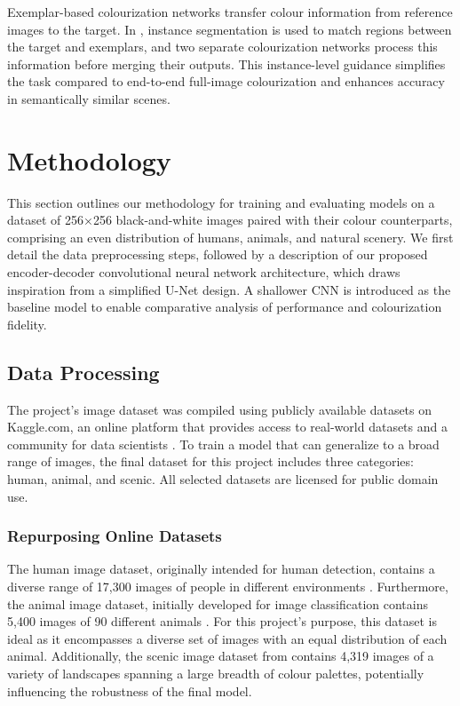 \documentclass{article} %
\begin{document}
Exemplar-based colourization networks transfer colour information from reference images to the target. In \citet{su2020instanceawareimagecolorization}, instance segmentation is used to match regions between the target and exemplars, and two separate colourization networks process this information before merging their outputs. This instance-level guidance simplifies the task compared to end-to-end full-image colourization and enhances accuracy in semantically similar scenes.

\section{Methodology}
\label{methodology}

This section outlines our methodology for training and evaluating models on a dataset of 256×256 black-and-white images paired with their colour counterparts, 
comprising an even distribution of humans, animals, and natural scenery. We first detail the data preprocessing steps, followed by a description of our proposed 
encoder-decoder convolutional neural network architecture, which draws inspiration from a simplified U-Net design. A shallower CNN is introduced as the baseline model 
to enable comparative analysis of performance and colourization fidelity.

\subsection{Data Processing}

 The project's image dataset was compiled using publicly available datasets on Kaggle.com, an online platform that provides access to real-world datasets and a community for data scientists \citep[]{kaggle}. To train a model that can generalize to a broad range of images, the final dataset for this project includes three categories: human, animal, and scenic. All selected datasets are licensed for public domain use. 

 \subsubsection{Repurposing Online Datasets}

The human image dataset, originally intended for human detection, contains a diverse range of 17,300 images of people in different environments \citep[]{kaggle_human}. Furthermore, the animal image dataset, initially developed for image classification contains 5,400 images of 90 different animals \citep[]{kaggle_animal}. For this project’s purpose, this dataset is ideal as it encompasses a diverse set of images with an equal distribution of each animal. Additionally, the scenic image dataset from \citet{kaggle_scene} contains 4,319 images of a variety of landscapes spanning a large breadth of colour palettes, potentially influencing the robustness of the final model.
\end{document}
